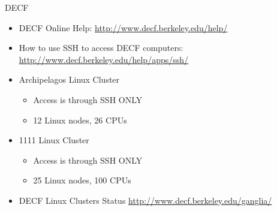 \documentclass[xcolor=x11names]{beamer}
\begin{document}
\begin{frame}{DECF}

\begin{itemize}

\item DECF Online Help: \href{http://www.decf.berkeley.edu/help/}{http://www.decf.berkeley.edu/help/}	

\item How to use SSH to access DECF computers: \href{http://www.decf.berkeley.edu/help/apps/ssh/}{http://www.decf.berkeley.edu/help/apps/ssh/}

\item Archipelagos Linux Cluster	
  \begin{itemize}
  \item Access is through SSH ONLY	
  \item 12 Linux nodes, 26 CPUs
  \end{itemize}

\item 1111 Linux Cluster		
  \begin{itemize}
  \item Access is through SSH ONLY
  \item 25 Linux nodes, 100 CPUs
  \end{itemize}

\item DECF Linux Clusters Status \href{http://www.decf.berkeley.edu/ganglia/}{http://www.decf.berkeley.edu/ganglia/}

\end{itemize}

\end{frame}
\end{document}
